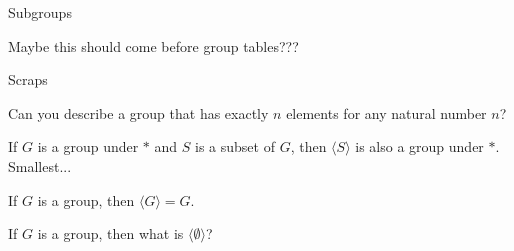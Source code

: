 
\begin{section}{Subgroups}


Maybe this should come before group tables???

\end{section}




\begin{section}{Scraps}


\begin{problem}
Can you describe a group that has exactly $n$ elements for any natural number $n$?
\end{problem}

\begin{theorem}%
If $G$ is a group under $*$ and $S$ is a subset of $G$, then $\langle S\rangle$ is also a group under $*$. Smallest...
\end{theorem}

\begin{theorem}
If $G$ is a group, then $\langle G\rangle =G$.
\end{theorem}

\begin{problem}
If $G$ is a group, then what is $\langle \emptyset\rangle$?
\end{problem}

\end{section}

